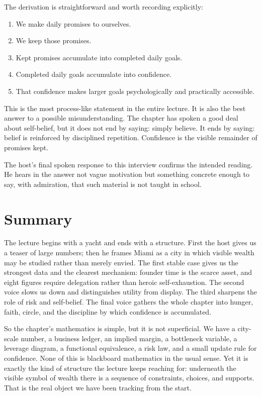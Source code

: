 The derivation is straightforward and worth recording explicitly:
\begin{enumerate}
\item We make daily promises to ourselves.
\item We keep those promises.
\item Kept promises accumulate into completed daily goals.
\item Completed daily goals accumulate into confidence.
\item That confidence makes larger goals psychologically and practically accessible.
\end{enumerate}

This is the most process-like statement in the entire lecture. It is also the best answer to a possible misunderstanding. The chapter has spoken a good deal about self-belief, but it does not end by saying: simply believe. It ends by saying: belief is reinforced by disciplined repetition. Confidence is the visible remainder of promises kept.

The host's final spoken response to this interview confirms the intended reading. He hears in the answer not vague motivation but something concrete enough to say, with admiration, that such material is not taught in school.

\section{Summary}

The lecture begins with a yacht and ends with a structure. First the host gives us a teaser of large numbers; then he frames Miami as a city in which visible wealth may be studied rather than merely envied. The first stable case gives us the strongest data and the clearest mechanism: founder time is the scarce asset, and eight figures require delegation rather than heroic self-exhaustion. The second voice slows us down and distinguishes utility from display. The third sharpens the role of risk and self-belief. The final voice gathers the whole chapter into hunger, faith, circle, and the discipline by which confidence is accumulated.

So the chapter's mathematics is simple, but it is not superficial. We have a city-scale number, a business ledger, an implied margin, a bottleneck variable, a leverage diagram, a functional equivalence, a risk law, and a small update rule for confidence. None of this is blackboard mathematics in the usual sense. Yet it is exactly the kind of structure the lecture keeps reaching for: underneath the visible symbol of wealth there is a sequence of constraints, choices, and supports. That is the real object we have been tracking from the start.